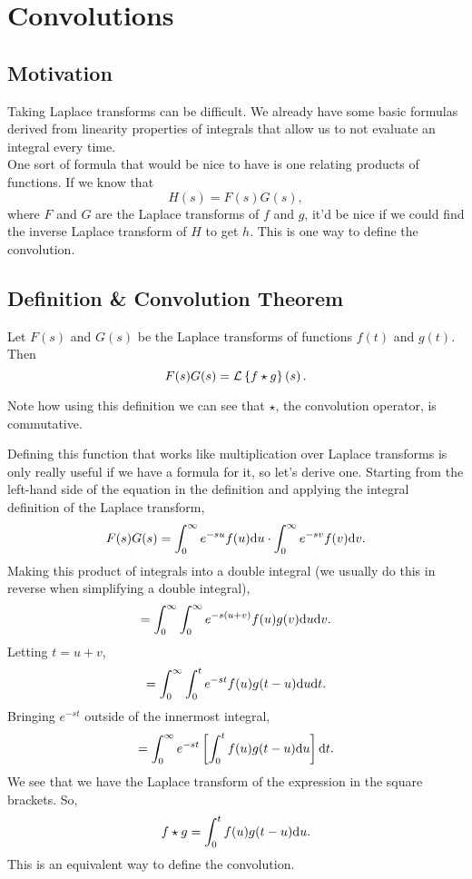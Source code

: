 \section{Convolutions}
\subsection{Motivation}
Taking Laplace transforms can be difficult.
We already have some basic formulas derived from linearity properties of integrals that allow us to not evaluate an integral every time.\\

\noindent
One sort of formula that would be nice to have is one relating products of functions.
If we know that
\begin{equation*}
	H(s) = F(s)G(s),
\end{equation*}
where $F$ and $G$ are the Laplace transforms of $f$ and $g$, it'd be nice if we could find the inverse Laplace transform of $H$ to get $h$.
This is one way to define the convolution.

\subsection{Definition \& Convolution Theorem}
\begin{definition}
	Let $F(s)$ and $G(s)$ be the Laplace transforms of functions $f(t)$ and $g(t)$.
	Then
	\begin{equation*}
		F(s)G(s) = \mathcal{L}\left\{ f \star g \right\}\left(s\right).
	\end{equation*}
\end{definition}
\noindent
Note how using this definition we can see that $\star$, the convolution operator, is commutative.

\noindent
Defining this function that works like multiplication over Laplace transforms is only really useful if we have a formula for it, so let's derive one.
Starting from the left-hand side of the equation in the definition and applying the integral definition of the Laplace transform,
\begin{equation*}
	F(s)G(s) = \int_{0}^{\infty}{e^{-su}f(u)\mathrm{d} u} \cdot \int_{0}^{\infty}{e^{-sv}f(v)\mathrm{d} v}.
\end{equation*}
Making this product of integrals into a double integral (we usually do this in reverse when simplifying a double integral),
\begin{equation*}
	= \int_{0}^{\infty}{\int_{0}^{\infty}{e^{-s(u+v)}f(u)g(v)\mathrm{d} u}\mathrm{d} v}.
\end{equation*}
Letting $t = u+v$,
\begin{equation*}
	= \int_{0}^{\infty}{\int_{0}^{t}{e^{-st}f(u)g(t-u)\mathrm{d} u}\mathrm{d} t}.
\end{equation*}
Bringing $e^{-st}$ outside of the innermost integral,
\begin{equation*}
	= \int_{0}^{\infty}{e^{-st}\left[\int_{0}^{t}{f(u)g(t-u)\mathrm{d} u}\right]\mathrm{d} t}.
\end{equation*}
We see that we have the Laplace transform of the expression in the square brackets.
So,
\begin{equation*}
	f \star g = \int_{0}^{t}{f(u)g(t-u)\mathrm{d} u}.
\end{equation*}
This is an equivalent way to define the convolution.

